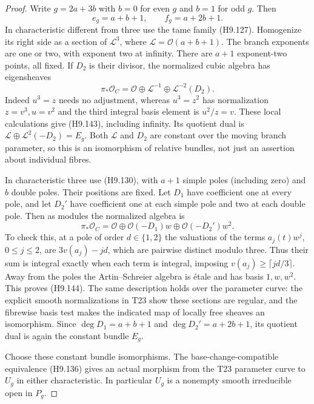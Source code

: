 \begin{proof}
Write $g=2a+3b$ with $b=0$ for even $g$ and $b=1$ for
odd $g$. Then
\[
                       e_g=a+b+1,\qquad f_g=a+2b+1.
                                                               \tag{H9.142}
\]
In characteristic different from three use the tame
family (H9.127). Homogenize its right side as a section
of $\mathcal L^3$, where $\mathcal L=\mathcal O(a+b+1)$.
The branch exponents are one or two, with exponent two
at infinity. There are $a+1$ exponent-two points, all
fixed. If $D_2$ is their divisor, the normalized cubic
algebra has eigensheaves
\[
 \pi_*\mathcal O_C
       =\mathcal O\oplus\mathcal L^{-1}
                          \oplus\mathcal L^{-2}(D_2).
                                                               \tag{H9.143}
\]
Indeed $u^3=z$ needs no adjustment, whereas $u^3=z^2$
has normalization $z=v^3,u=v^2$ and the third integral
basis element is $u^2/z=v$. These local calculations
give (H9.143), including infinity. Its quotient dual is
$\mathcal L\oplus\mathcal L^2(-D_2)=E_g$.
Both $\mathcal L$ and $D_2$ are constant over the moving
branch parameter, so this is an isomorphism of relative
bundles, not just an assertion about individual fibres.

In characteristic three use (H9.130), with $a+1$
simple poles (including zero) and $b$ double poles.
Their positions are fixed. Let $D_1$ have coefficient
one at every pole, and let $D_2'$ have coefficient one
at each simple pole and two at each double pole. Then
as modules the normalized algebra is
\[
 \pi_*\mathcal O_C
       =\mathcal O\oplus\mathcal O(-D_1)w
                          \oplus\mathcal O(-D_2')w^2.
                                                               \tag{H9.144}
\]
To check this, at a pole of order $d\in\{1,2\}$ the
valuations of the terms $a_j(t)w^j$, $0\le j\le2$,
are $3v(a_j)-jd$, which are pairwise distinct modulo
three. Thus their sum is integral exactly when each
term is integral, imposing $v(a_j)\ge\lceil jd/3\rceil$.
Away from the poles the Artin--Schreier algebra is
\'etale and has basis $1,w,w^2$. This proves (H9.144).
The same description holds over the parameter curve:
the explicit smooth normalizations in T23 show these
sections are regular, and the fibrewise basis test
makes the indicated map of locally free sheaves an
isomorphism. Since $\deg D_1=a+b+1$ and
$\deg D_2'=a+2b+1$, its quotient dual is again the
constant bundle $E_g$.

Choose these constant bundle isomorphisms. The
base-change-compatible equivalence (H9.136) gives
an actual morphism from the T23 parameter curve to
$U_g$ in either characteristic. In particular $U_g$
is a nonempty smooth irreducible open in $P_g$.


\end{proof}
